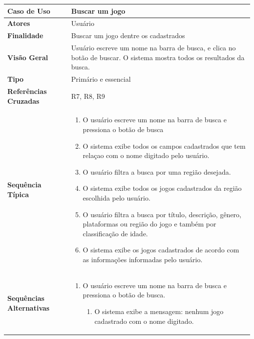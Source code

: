 \documentclass[a4paper,11pt]{article}
\begin{document}
\begin{table}[H]
		\begin{tabularx}{\textwidth}{|l|X|}
		\hline
			\textbf{Caso de Uso} &  Buscar um jogo \\ \hline
			\textbf{Atores} &  Usuário  \\ \hline
			\textbf{Finalidade} &   Buscar um jogo dentre os cadastrados  \\ \hline
			\textbf{Visão Geral} &  Usuário escreve um nome na barra de busca, e clica no botão
de buscar. O sistema mostra todos os resultados da busca.  \\ \hline
			\textbf{Tipo} &   Primário e essencial \\ \hline
			\textbf{Referências Cruzadas} &   R7, R8, R9 \\ \hline
			\textbf{Sequência Típica} & 
			
			\begin{enumerate}
			\item O usuário escreve um nome na barra de busca e pressiona o botão de busca
			
			\item O sistema exibe todos os campos cadastrados que tem relaçao com o nome digitado pelo usuário.
			
			\item O usuário filtra a busca por uma região desejada.
			
			\item O sistema exibe todos os jogos cadastrados da região escolhida pelo usuário.
			
			\item O usuário filtra a busca por título, descrição, gênero, plataformas ou região do jogo e também por classificação de idade.
			
			\item O sistema exibe os jogos cadastrados de acordo com as informações informadas pelo usuário.
			\end{enumerate} \\ \hline
			
			
			\textbf{Sequências Alternativas} & 
						
			\begin{enumerate}
			\item O usuário escreve um nome na barra de busca e pressiona o botão de busca.
			\begin{enumerate}
			\item O sistema exibe a mensagem: nenhum jogo cadastrado com o nome digitado.
			\end{enumerate}
			

\end{enumerate}
\end{tabularx}
\end{table}
\end{document}
